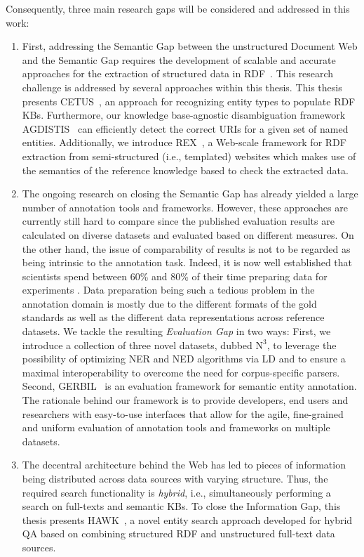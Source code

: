 Consequently, three main research gaps will be considered and addressed in this work:
\begin{enumerate}
\item 
First, addressing the Semantic Gap between the unstructured Document Web and the Semantic Gap requires the development of scalable and accurate approaches for the extraction of structured data in \ac{RDF}~\cite{rdfprimer}.
This research challenge is addressed by several approaches within this thesis.
This thesis presents CETUS~\cite{CETUS_2015}, an approach for recognizing entity types to populate \ac{RDF} \ac{KB}s. 
Furthermore, our knowledge base-agnostic disambiguation framework AGDISTIS~\cite{agdistis_iswc} can efficiently detect the correct URIs for a given set of named entities.
Additionally, we introduce REX~\cite{rex}, a Web-scale framework for \ac{RDF} extraction from semi-structured (i.e., templated) websites which makes use of the semantics of the reference knowledge based to check the extracted data.
\item 
The ongoing research on closing the Semantic Gap has already yielded a large number of annotation tools and frameworks.
However, these approaches are currently still hard to compare since the published evaluation results are calculated on diverse datasets and evaluated based on different measures.
On the other hand, the issue of  comparability of results is not to be regarded as being intrinsic to the annotation task. 
Indeed, it is now well established that scientists spend between 60\% and 80\% of their time preparing data for experiments \cite{GIL2014,jermyn1999preparing,peng2011reproducible}. 
Data preparation being such a tedious problem in the annotation domain is mostly due to the different formats of the gold standards as well as the different data representations across reference datasets.
We tackle the resulting \emph{Evaluation Gap} in two ways: First, we introduce a collection of three novel datasets, dubbed $\mbox{N}^3$, to leverage the possibility of optimizing NER and NED algorithms via \ac{LD} and to ensure a maximal interoperability to overcome the need for corpus-specific parsers. 
Second, GERBIL~\cite{GERBIL} is an evaluation framework for semantic entity annotation. 
The rationale behind our framework is to provide developers, end users and researchers with easy-to-use interfaces that allow for the agile, fine-grained and uniform evaluation of annotation tools and frameworks on multiple datasets.
\item 
The decentral architecture behind the Web has led to pieces of information being distributed across data sources with varying structure. 
Thus, the required search functionality is \emph{hybrid}, i.e., simultaneously performing a search on full-texts and semantic \ac{KB}s.
To close the {Information Gap}, this thesis presents HAWK~\cite{hawk_2015}, a novel entity search approach developed for hybrid \ac{QA} based on combining structured \ac{RDF} and unstructured full-text data sources.
\end{enumerate}



